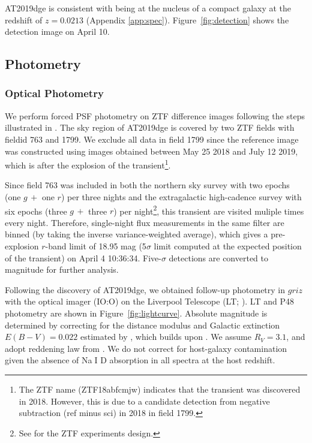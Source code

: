 \documentclass[twocolumn]{aastex63}
\def\ion#1#2{#1$\;${\footnotesize\rm{#2}}\relax}
\newcommand{\todo}[1]{{\color{magenta} to-do: {#1}}}
\begin{document}
\begin{CJK*}{UTF8}{gbsn}
AT2019dge is consistent with being at the nucleus of a compact galaxy at the redshift of $z=0.0213$ 
(Appendix \ref{app:spec}). Figure~\ref{fig:detection} shows the detection image on April 10. 
 
\subsection{Photometry}

\subsubsection{Optical Photometry} \label{subsubsec:opt_phot}
We perform forced PSF photometry on ZTF difference images following the steps illustrated in 
\citet{Yao2019}. 
The sky region of AT2019dge is covered by two ZTF fields with fieldid 763 and 
1799. We exclude all data in field 1799 since the reference image was constructed using images 
obtained between May 25 2018 and July 12 2019, which is after the explosion of the 
transient\footnote{The ZTF name (ZTF18abfcmjw) indicates that the transient was discovered in 2018. 
However, this is due to a candidate detection from negative subtraction (ref minus sci) in 2018 in field 
1799.}.

Since field 763 was included in both the northern sky survey with two epochs (one 
$g\, +$ one $r$) per three nights and the extragalactic high-cadence survey with six epochs (three 
$g\,+$ three $r$) per night\footnote{See \citet{Bellm2019a} for the ZTF experiments design.}, this 
transient are visited muliple times every night. Therefore, single-night flux measurements in the same 
filter are binned (by taking the inverse variance-weighted 
average), which gives a pre-explosion $r$-band limit of 18.95 mag (5$\sigma$ limit computed at the 
expected position of the transient) on April 4 10:36:34. Five-$\sigma$ detections are converted to 
magnitude for further analysis.

Following the discovery of AT2019dge, we obtained follow-up photometry in $griz$ with the optical 
imager (IO:O) on the Liverpool Telescope (LT; \citealt{Steele2004}). LT and P48 photometry are shown 
in Figure~\ref{fig:lightcurve}. Absolute magnitude is determined 
by correcting for the distance modulus and Galactic extinction $E(B-V)=0.022$ estimated by 
\citet{Schlafly2011}, which builds upon \citet{Schlegel1998}. We assume $R_V=3.1$, and adopt
reddening law from \citet{Cardelli1989}. We do not correct for host-galaxy contamination given the 
absence of \ion{Na}{I} D absorption in all spectra at the host redshift. 


\end{CJK*}
\end{document}
